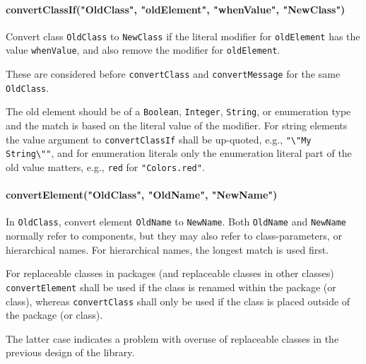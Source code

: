 \paragraph*{convertClassIf("OldClass", "oldElement", "whenValue", "NewClass")}\label{convertclassifoldclass-oldelement-whenvalue-newclass}

Convert class \lstinline!OldClass! to \lstinline!NewClass! if the literal modifier for \lstinline!oldElement! has the value \lstinline!whenValue!, and also remove the modifier for \lstinline!oldElement!.

These are considered before \lstinline!convertClass! and \lstinline!convertMessage! for the same \lstinline!OldClass!.

The old element should be of a \lstinline!Boolean!, \lstinline!Integer!, \lstinline!String!, or enumeration type and the match is based on the literal value of the modifier.
For string elements the value argument to \lstinline!convertClassIf! shall be up-quoted, e.g., \lstinline!"\"My String\""!, and for enumeration literals only the enumeration literal part of the old value matters, e.g., \lstinline!red! for \lstinline!"Colors.red"!.

\paragraph*{convertElement("OldClass", "OldName", "NewName")}\label{convertelementoldclassoldnamenewname}

In \lstinline!OldClass!, convert element \lstinline!OldName! to \lstinline!NewName!.
Both \lstinline!OldName! and \lstinline!NewName! normally refer to components, but they may also refer to class-parameters, or hierarchical names.
For hierarchical names, the longest match is used first.

For replaceable classes in packages (and replaceable classes in other classes) \lstinline!convertElement! shall be used if the class is renamed within the package (or class), whereas \lstinline!convertClass! shall only be used if the class is placed outside of the package (or class).

\begin{nonnormative}
The latter case indicates a problem with overuse of replaceable classes in the previous design of the library.
\end{nonnormative}

